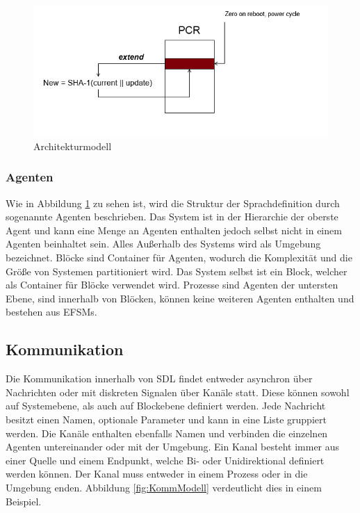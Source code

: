 \begin{figure}[ht]
	\centering
	\includegraphics[width=1\textwidth]{test.png}
	\caption{Architekturmodell}
	\label{fig:ArchModell}
\end{figure}

\subsubsection{Agenten}
Wie in Abbildung \ref{fig:ArchModell} zu sehen ist, wird die Struktur der Sprachdefinition durch sogenannte Agenten beschrieben.
Das System ist in der Hierarchie der oberste Agent und kann eine Menge an Agenten enthalten jedoch selbst nicht in einem Agenten beinhaltet sein.
Alles Außerhalb des Systems wird als Umgebung bezeichnet. Blöcke sind Container für Agenten, wodurch die Komplexität und die Größe von Systemen partitioniert wird.
Das System selbst ist ein Block, welcher als Container für Blöcke verwendet wird. 
Prozesse sind Agenten der untersten Ebene, sind innerhalb von Blöcken, können keine weiteren Agenten enthalten und bestehen aus \ac{EFSM}s.


\subsection{Kommunikation}
\label{ssc:Kommunikation}
Die Kommunikation innerhalb von \ac{SDL} findet entweder asynchron über Nachrichten oder mit diskreten Signalen über Kanäle statt. 
Diese können sowohl auf Systemebene, als auch auf Blockebene definiert werden.
Jede Nachricht besitzt einen Namen, optionale Parameter und kann in eine Liste gruppiert werden. 
Die Kanäle enthalten ebenfalls Namen und verbinden die einzelnen Agenten untereinander oder mit der Umgebung.
Ein Kanal besteht immer aus einer Quelle und einem Endpunkt, welche Bi- oder Unidirektional definiert werden können. Der Kanal muss entweder in einem Prozess oder in die Umgebung enden.
 Abbildung \ref{fig:KommModell} verdeutlicht dies in einem Beispiel.
 
